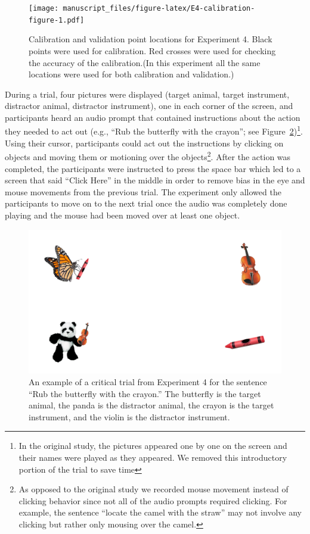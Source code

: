 \documentclass[
  man,floatsintext]{apa6}
\begin{document}
\begin{figure}
\centering
\texttt{[image: manuscript\_files/figure-latex/E4-calibration-figure-1.pdf]}
\caption{\label{fig:E4-calibration-figure}Calibration and validation point locations for Experiment 4. Black points were used for calibration. Red crosses were used for checking the accuracy of the calibration.(In this experiment all the same locations were used for both calibration and validation.)}
\end{figure}

During a trial, four pictures were displayed (target animal, target
instrument, distractor animal, distractor instrument), one in each
corner of the screen, and participants heard an audio prompt that
contained instructions about the action they needed to act out (e.g.,
``Rub the butterfly with the crayon''; see Figure~\ref{fig:E4-example-trial})\footnote{In the original study, the pictures appeared one by one on the
  screen and their names were played as they appeared. We removed this
  introductory portion of the trial to save time}. Using their
cursor, participants could act out the instructions by clicking on
objects and moving them or motioning over the objects\footnote{As opposed to the original study we recorded mouse movement
  instead of clicking behavior since not all of the audio prompts
  required clicking. For example, the sentence ``locate the camel with
  the straw'' may not involve any clicking but rather only mousing over
  the camel.}. After the
action was completed, the participants were instructed to press the
space bar which led to a screen that said ``Click Here'' in the middle in
order to remove bias in the eye and mouse movements from the previous
trial. The experiment only allowed the participants to move on to the
next trial once the audio was completely done playing and the mouse had
been moved over at least one object.

\begin{figure}
\includegraphics[width=4.5in]{group-d/E4-example-figure} \caption{An example of a critical trial from Experiment 4 for the sentence “Rub the butterfly with the crayon.” The butterfly is the target animal, the panda is the distractor animal, the crayon is the target instrument, and the violin is the distractor instrument.}\label{fig:E4-example-trial}
\end{figure}
\end{document}
